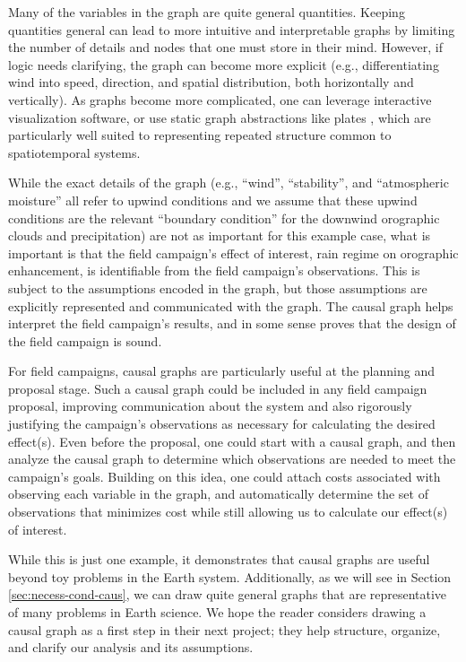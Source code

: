 \documentclass[12pt]{article}
\begin{document}
Many of the variables in the graph are quite general
quantities. Keeping quantities general can lead to more intuitive and
interpretable graphs by limiting the number of details and nodes that
one must store in their mind. However, if logic needs clarifying, the
graph can become more explicit (e.g., differentiating wind into speed,
direction, and spatial distribution, both horizontally and
vertically). As graphs become more complicated, one can leverage
interactive visualization software, or use static graph abstractions
like plates \citep{bishop2006pattern}, which are particularly well
suited to representing repeated structure common to spatiotemporal
systems.

While the exact details of the graph (e.g., ``wind'', ``stability'',
and ``atmospheric moisture'' all refer to upwind conditions and we
assume that these upwind conditions are the relevant ``boundary
condition'' for the downwind orographic clouds and precipitation) are
not as important for this example case, what is important is that the
field campaign's effect of interest, rain regime on orographic
enhancement, is identifiable from the field campaign's
observations. This is subject to the assumptions encoded in the graph,
but those assumptions are explicitly represented and communicated with
the graph. The causal graph helps interpret the field campaign's
results, and in some sense proves that the design of the field
campaign is sound.

For field campaigns, causal graphs are particularly useful at the
planning and proposal stage. Such a causal graph could be included in
any field campaign proposal, improving communication about the system
and also rigorously justifying the campaign’s observations as
necessary for calculating the desired effect(s). Even before the
proposal, one could start with a causal graph, and then analyze the
causal graph to determine which observations are needed to meet the
campaign’s goals. Building on this idea, one could attach costs
associated with observing each variable in the graph, and
automatically determine the set of observations that minimizes cost
while still allowing us to calculate our effect(s) of interest.

While this is just one example, it demonstrates that causal graphs are
useful beyond toy problems in the Earth system. Additionally, as we
will see in Section \ref{sec:necess-cond-caus}, we can draw quite
general graphs that are representative of many problems in Earth
science. We hope the reader considers drawing a causal graph as a
first step in their next project; they help structure, organize, and
clarify our analysis and its assumptions.
\end{document}
